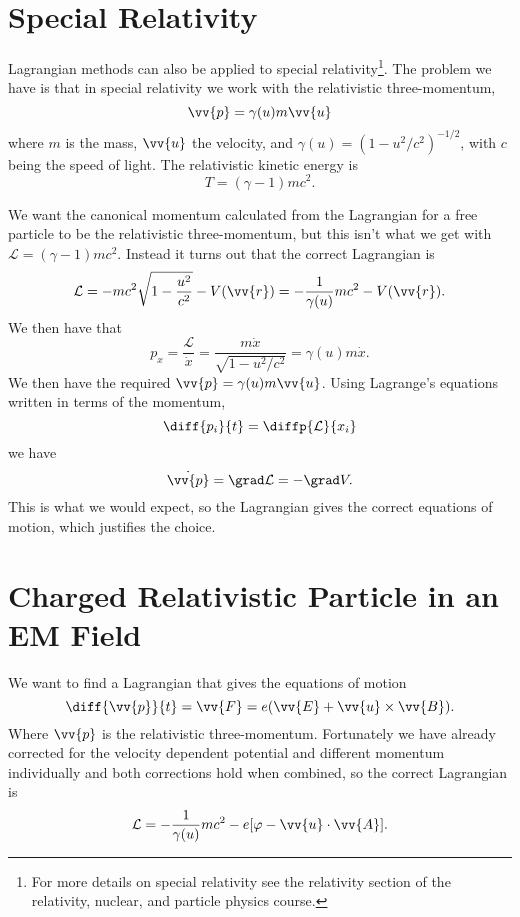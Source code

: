 \documentclass[fleqn]{NotesClass}
\newcommand*{\lagrangian}{\mathcal{L}}
\begin{document}
    \section{Special Relativity}
    Lagrangian methods can also be applied to special relativity\footnote{For more details on special relativity see the relativity section of the relativity, nuclear, and particle physics course.}.
    The problem we have is that in special relativity we work with the relativistic three-momentum,
    \begin{equation}
        \vv{p} = \gamma(u)m\vv{u}
    \end{equation}
    where \(m\) is the mass, \(\vv{u}\) the velocity, and \(\gamma(u) = (1 - u^2/c^2)^{-1/2}\), with \(c\) being the speed of light.
    The relativistic kinetic energy is
    \begin{equation}
        T = (\gamma - 1)mc^2.
    \end{equation}
    
    We want the canonical momentum calculated from the Lagrangian for a free particle to be the relativistic three-momentum, but this isn't what we get with \(\lagrangian = (\gamma - 1)mc^2\).
    Instead it turns out that the correct Lagrangian is
    \begin{equation}
        \lagrangian = -mc^2\sqrt{1 - \frac{u^2}{c^2}} - V(\vv{r}) = -\frac{1}{\gamma(u)}mc^2 - V(\vv{r}).
    \end{equation}
    We then have that
    \begin{equation}
        p_x = \frac{\lagrangian}{\dot{x}} = \frac{m\dot{x}}{\sqrt{1 - u^2/c^2}} = \gamma(u)m\dot{x}.
    \end{equation}
    We then have the required \(\vv{p} = \gamma(u)m\vv{u}\).
    Using Lagrange's equations written in terms of the momentum,
    \begin{equation}
        \diff{p_i}{t} = \diffp{\lagrangian}{x_i}
    \end{equation}
    we have
    \begin{equation}
        \dot{\vv{p}} = \grad \lagrangian = -\grad V.
    \end{equation}
    This is what we would expect, so the Lagrangian gives the correct equations of motion, which justifies the choice.
    
    \section{Charged Relativistic Particle in an EM Field}
    We want to find a Lagrangian that gives the equations of motion
    \begin{equation}
        \diff{\vv{p}}{t} = \vv{F} = e(\vv{E} + \vv{u} \times \vv{B}).
    \end{equation}
    Where \(\vv{p}\) is the relativistic three-momentum.
    Fortunately we have already corrected for the velocity dependent potential and different momentum individually and both corrections hold when combined, so the correct Lagrangian is
    \begin{equation}
        \lagrangian = -\frac{1}{\gamma(u)}mc^2 - e[\varphi - \vv{u}\cdot\vv{A}].
    \end{equation}
    
\end{document}
